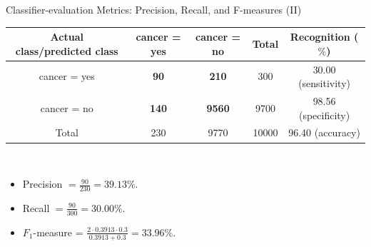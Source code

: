 \begin{frame}{Classifier-evaluation Metrics: Precision, Recall, and F-measures (II)}
  \centering
  \begin{tabular}{|c|c|c|c|c|}
    \hline
    Actual class/predicted class & cancer = yes & cancer = no & Total & Recognition ($\%$) \\\hline
    cancer = yes & \textbf{90} & \textbf{210} & 300 & 30.00 (sensitivity) \\\hline
    cancer = no & \textbf{140} & \textbf{9560} & 9700 & 98.56 (specificity) \\\hline
    Total & 230 & 9770 & 10000 & 96.40 (accuracy) \\\hline
  \end{tabular}\\[0.2cm]
  \begin{itemize}
  \item Precision $= \frac{90}{230} = 39.13 \%$.
  \item Recall $=\frac{90}{300} = 30.00 \%$.
  \item $F_1$-measure = $\frac{2 \cdot 0.3913 \cdot 0.3}{0.3913 + 0.3} = 33.96 \%$.
  \end{itemize}
\end{frame}


